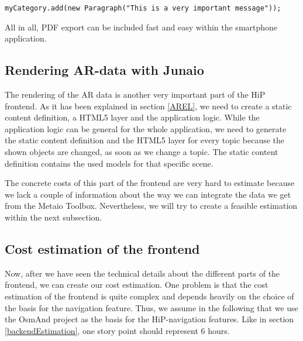 \verb|myCategory.add(new Paragraph("This is a very important message"));|  

All in all, \ac{PDF} export can be included fast and easy within the smartphone application.

\subsection{Rendering AR-data with Junaio}
The rendering of the \ac{AR} data is another very important part of the \ac{HiP} frontend. As it has been explained in section \ref{AREL}, we need to create a static content definition, a \ac{HTML5} layer and the application logic. While the application logic can be general for the whole application, we need to generate the static content definition and the \ac{HTML5} layer for every topic because the shown objects are changed, as soon as we change a topic.
The static content definition contains the used models for that specific scene. 

The concrete costs of this part of the frontend are very hard to estimate because we lack a couple of information about the way we can integrate the data we get from the Metaio Toolbox. Nevertheless, we will try to create a feasible estimation within the next subsection.

\subsection{Cost estimation of the frontend}	
Now, after we have seen the technical details about the different parts of the frontend, we can create our cost estimation. One problem is that the cost estimation of the frontend is quite complex and depends heavily on the choice of the basis for the navigation feature. Thus, we assume in the following that we use the \ac{OsmAnd} project as the basis for the \ac{HiP}-navigation features. Like in section \ref{backendEstimation}, one story point should represent 6 hours.

